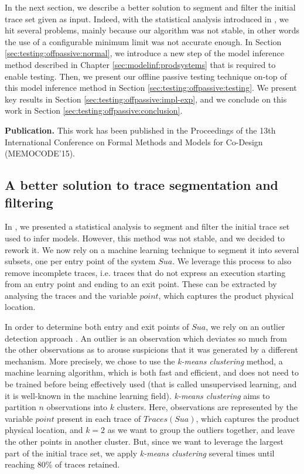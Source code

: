 In the next section, we describe a better solution to segment and
filter the initial trace set given as input. Indeed, with the
statistical analysis introduced in
,
we hit several problems, mainly because our algorithm was not
stable, in other words the use of a configurable minimum limit
was not accurate enough. In Section
\ref{sec:testing:offpassive:normal}, we introduce a new step of
the model inference method described in Chapter
\ref{sec:modelinf:prodsystems} that is required to enable
testing. Then, we present our offline passive testing technique
on-top of this model inference method in Section
\ref{sec:testing:offpassive:testing}. We present key results in
Section \ref{sec:testing:offpassive:impl-exp}, and we conclude on
this work in Section \ref{sec:testing:offpassive:conclusion}.

\textbf{Publication.} This work has been published in the
Proceedings of the 13th International Conference on Formal
Methods and Models for Co-Design (MEMOCODE'15).


\subsection{A better solution to trace segmentation and filtering}
\label{sec:testing:offpassive:segmentation}

In
,
we presented a statistical analysis to segment and filter the
initial trace set used to infer models. However, this method was
not stable, and we decided to rework it. We now rely on a machine
learning technique to segment it into several subsets, one per
entry point of the system $\mathit{Sua}$. We leverage this
process to also remove incomplete traces, i.e. traces that do not
express an execution starting from an entry point and ending to
an exit point. These can be extracted by analysing the traces and
the variable $point$, which captures the product physical
location.

In order to determine both entry and exit points of
$\mathit{Sua}$, we rely on an outlier detection approach
\cite{1695852}. An outlier is an observation which deviates so
much from the other observations as to arouse suspicions that it
was generated by a different mechanism. More precisely, we chose
to use the \textit{k-means clustering} method, a machine learning
algorithm, which is both fast and efficient, and does not need to
be trained before being effectively used (that is called
unsupervised learning, and it is well-known in the machine
learning field). \textit{k-means clustering} aims to partition
$n$ observations into $k$ clusters.  Here, observations are
represented by the variable $point$ present in each trace of
$Traces({Sua})$, which captures the product physical location,
and $k=2$ as we want to group the outliers together, and leave
the other points in another cluster. But, since we want to
leverage the largest part of the initial trace set, we apply
\textit{k-means clustering} several times until reaching 80\% of
traces retained.

